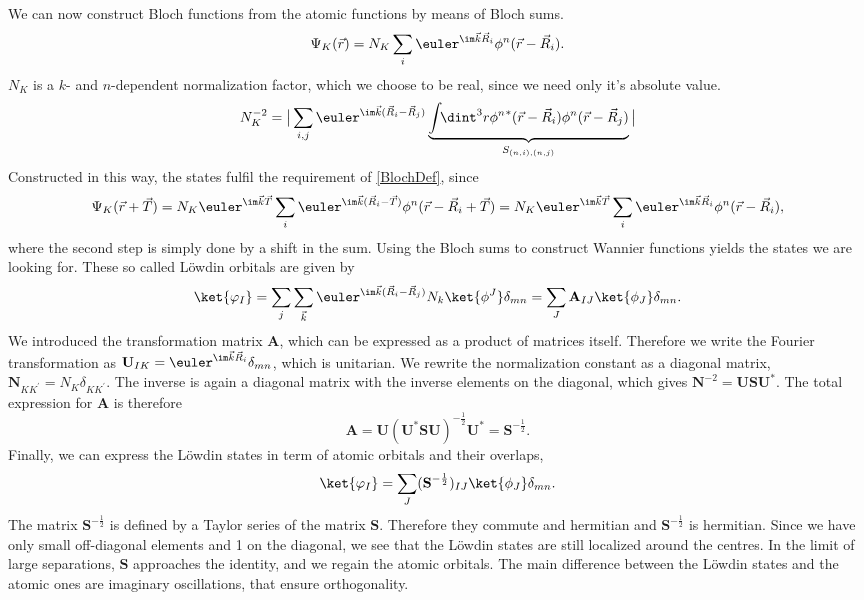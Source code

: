 \documentclass[a4paper,12pt]{report}
\begin{document}
We can now construct Bloch functions from the atomic functions by means of Bloch sums.
\begin{equation}
  \Psi_K(\vec{r}) = N_K \sum_{i} \euler^{\im \vec{k}\vec{R}_i }  \phi^n(\vec{r}-\vec{R}_i). 
\end{equation}
$N_K$ is a $k$- and $n$-dependent normalization factor, which we choose to be real, since we need only it's absolute value.
\begin{equation}
 N_K^{-2}  = \big| \sum_{i,j} \euler^{\im \vec k (\vec R_i-\vec R_j)}  
 \underbrace{\int \!\! \dint^3 r {\phi^n}^*(\vec r - \vec R_i) \phi^n(\vec r- \vec R_j)}_{S_{(n,i),(n,j)}} \big|
\end{equation}
Constructed in this way, the states fulfil the requirement of \ref{BlochDef}, since
\begin{equation}
 \Psi_{K}(\vec{r}+\vec{T}) 
 = N_{K} \euler^{\im \vec{k} \vec{T} } \sum_{i} \euler^{\im \vec{k} (\vec{R}_i-\vec{T})} \phi^n (\vec{r}-\vec{R}_i+\vec{T}) 
 = N_{K} \euler^{\im \vec{k} \vec{T} } \sum_{i} \euler^{\im \vec{k}\vec{R}_i }  \phi^{n}(\vec{r}-\vec{R}_i), 
\end{equation}
where the second step is simply done by a shift in the sum. 
Using the Bloch sums to construct Wannier functions yields the states we are looking for.
These so called Löwdin orbitals are given by
\begin{equation}
 \ket{\varphi_I} = \sum_{j}  \sum_{\vec k} \euler^{\im \vec k ( \vec R_i - \vec R_j ) } N_k \ket{\phi^J}\delta_{mn} = \sum_{J} \mathbf A_{IJ}\ket{\phi_J}\delta_{mn} .
\end{equation}
We introduced the transformation matrix $\mathbf A$, which can be expressed as a product of matrices itself.
Therefore we write the Fourier transformation as 
$\mathbf U_{IK} = \euler^{\im \vec k \vec R_i}\delta_{mn}$, which is unitarian. 
We rewrite the normalization constant as a diagonal matrix, $\mathbf N_{KK^{\prime}}= N_{K} \delta_{KK^{\prime}}$. 
The inverse is again a diagonal matrix with the inverse elements on the diagonal, which gives
$\mathbf N^{-2} = \mathbf U \mathbf S \mathbf U^*$.
The total expression for $\mathbf A$ is therefore
\begin{equation}
 \mathbf A = \mathbf U(\mathbf U^*\mathbf S\mathbf U)^{-\frac12}\mathbf U^* = \mathbf S^{-\frac12}.
\end{equation}
Finally, we can express the Löwdin states in term of atomic orbitals and their overlaps,
\begin{equation}
 \ket{\varphi_I} = \sum_J (\mathbf S^{-\frac12})_{IJ} \ket{\phi_J}\delta_{mn}.
\end{equation}
The matrix $\mathbf S^{-\frac12}$ is defined by a Taylor series of the matrix $\mathbf S$. 
Therefore they commute and hermitian and $\mathbf S^{-\frac12}$ is hermitian.
Since we have only small off-diagonal elements and 1 on the diagonal, we see that the Löwdin states are still
localized around the centres. 
In the limit of large separations, $\mathbf S$ approaches the identity, and we regain the atomic orbitals.
The main difference between the Löwdin states and the atomic ones are imaginary oscillations, that ensure orthogonality.
\end{document}
